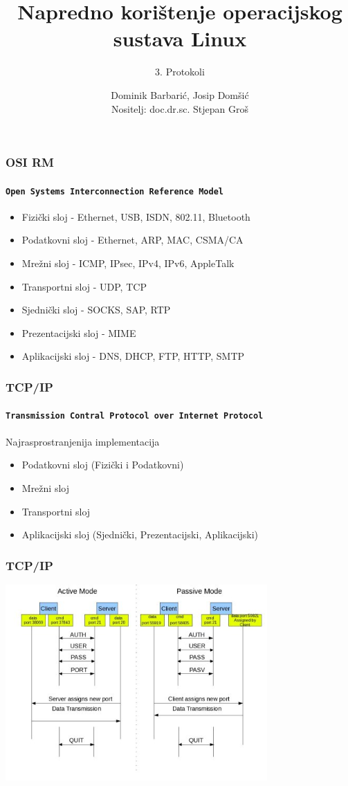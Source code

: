 \documentclass[t,table,usenames,dvipsnames]{beamer}
\date{\todayiso}
\title[NKOSL]{Napredno korištenje operacijskog sustava Linux}
\author[Dominik Barbarić, Josip Domšić]{Dominik Barbarić, Josip Domšić\\{\small Nositelj: doc.dr.sc. Stjepan Groš}}
\subtitle{3. Protokoli}
\institute[FER]{Sveučilište u Zagrebu\\Fakultet elektrotehnike i računarstva}
\begin{document}
{
	\begin{frame}
		\maketitle
	\end{frame}
}

\begin{frame}
    \frametitle{OSI RM}
	\framesubtitle{\texttt{Open Systems Interconnection Reference Model}}
    \begin{itemize}
        \item Fizički sloj - Ethernet, USB, ISDN, 802.11, Bluetooth
        \item Podatkovni sloj - Ethernet, ARP, MAC, CSMA/CA 
        \item Mrežni sloj - ICMP, IPsec, IPv4, IPv6, AppleTalk
        \item Transportni sloj - UDP, TCP
        \item Sjednički sloj - SOCKS, SAP, RTP
        \item Prezentacijski sloj - MIME
        \item Aplikacijski sloj - DNS, DHCP, FTP, HTTP, SMTP
    \end{itemize}

\end{frame}

\begin{frame}
    \frametitle{TCP/IP}
	\framesubtitle{\texttt{Transmission Contral Protocol over Internet Protocol}}
    Najrasprostranjenija implementacija
    \begin{itemize}
        \item Podatkovni sloj (Fizički i Podatkovni)
        \item Mrežni sloj
        \item Transportni sloj
        \item Aplikacijski sloj (Sjednički, Prezentacijski, Aplikacijski)
    \end{itemize}
\end{frame}


\begin{frame}
    \frametitle{TCP/IP}
    \includegraphics[width=0.75\textwidth]{ftp.jpg}
\end{frame}
\end{document}
